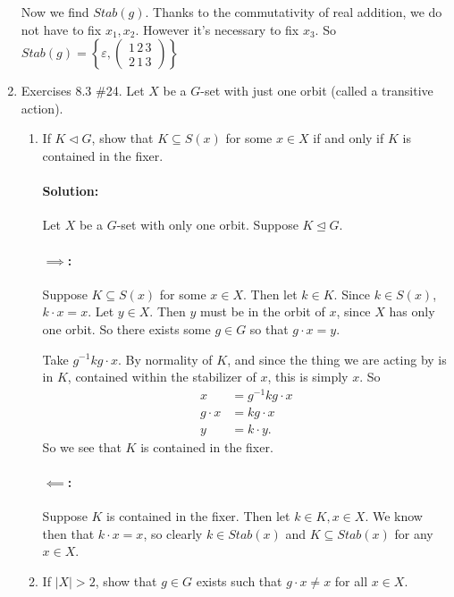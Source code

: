 \documentclass{article}
\begin{document}
\begin{enumerate}
    Now we find $Stab(g)$. Thanks to the commutativity of real addition, we do not have to fix  $x_1,x_2$. However it's necessary to fix
    $x_3$. So $Stab(g)=\left\{\varepsilon,\begin{pmatrix} 1\,2\,3\\2\,1\,3 \end{pmatrix} \right\} $

\item Exercises 8.3 \#24.  Let $X$ be a $G$-set with just one orbit (called a transitive action).
\begin{enumerate}
\item If $K\triangleleft G$, show that $K\subseteq S(x)$ for some $x\in X$ if and only if $K$ is contained in the fixer.

    \paragraph{Solution: }
        Let $X$ be a $G$-set with only one orbit. Suppose $K\trianglelefteq G$.
        \paragraph{$\implies$:} Suppose $K\subseteq S(x)$ for some $x\in X$. Then let $k\in K$. Since $k\in S(x)$, $k\cdot x=x$. Let $y \in X$. Then $y$ must be in the orbit
        of $x$, since $X$ has only one orbit. So there exists some $g\in G$ so that $g\cdot x=y$. 

        Take $g^{-1}kg\cdot x$. By normality of $K$, and since the thing we are acting by is in $K$, contained within the stabilizer of $x$, this is simply $x$. 
        So 
        \begin{align*}
            x&=g^{-1}kg\cdot x\\
            g\cdot x&= kg\cdot x \\
            y&= k\cdot y 
        .\end{align*}
        So we see that $K$ is contained in the fixer.

        \paragraph{$\impliedby$:} Suppose $K$ is contained in the fixer. Then let $k\in K,x\in X$. We know then that $k\cdot x=x$, so clearly $k\in Stab(x)$
        and $K\subseteq Stab(x)$ for any $x\in X$.

\item If $|X|>2$, show that $g\in G$ exists such that $g\cdot x\neq x$ for all $x\in X$.

\end{enumerate}
\end{enumerate}
\end{document}
